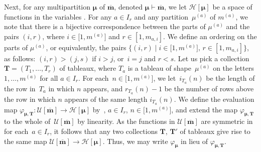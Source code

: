 \documentclass[pdftex]{sigma}
\numberwithin{equation}{section}
\begin{document}
Next, for any multipartition $\bm{\mu}$ of $\overline{\mathbf{m}}$, denoted $\bm{\mu}\vdash \overline{\mathbf{m}}$, we let $\mathcal{H}[\bm{\mu}]$ be a space of functions in the variables
.
For any $a\in I_r$ and any partition~$\mu^{(a)}$ of $m^{(a)}$, we note that there is a bijective correspondence between the parts of $\mu^{(a)}$ and the pairs $(i,r)$, where $i\in \bigl[1,m^{(a)}\bigr]$ and $r\in[1,m_{a,i}]$. We define an ordering on the parts of $\mu^{(a)}$, or equivalently, the pairs $\bigl\{(i,r)\mid i\in \bigl[1,m^{(a)}\bigr],\, r\in[1,m_{a,i}]\bigr\}$, as follows:
$
(i,r)>(j,s)$ if ${i>j}$, or~${ i=j}$ and $r<s$.
Let us pick a collection $\mathbf{T}=(T_1,\dots,T_r)$ of tableaux, where $T_a$ is a tableau of shape~$\mu^{(a)}$ on the letters $1,\dots,m^{(a)}$ for all $a\in I_r$. For each~${n\in\bigl[1,m^{(a)}\bigr]}$, we let~${i_{T_a}(n)}$ be the length of the row in~$T_a$ in which $n$ appears, and $r_{T_a}(n)-1$ be the number of rows above the row in which $n$ appears of the same length $i_{T_a}(n)$. We define the evaluation map ${\varphi_{\bm{\mu},\mathbf{T}}\colon \mathcal{U}[\overline{\mathbf{m}}]\to \mathcal{H}[\bm{\mu}]}$ by~, $ a\in I_r$, $n\in\bigl[1,m^{(a)}\bigr]$,
and extend the map $\varphi_{\bm{\mu},\mathbf{T}}$ to the whole of~$\mathcal{U}[\overline{\mathbf{m}}]$ by linearity. As the functions in $\mathcal{U}[\overline{ \mathbf{m}}]$ are symmetric in~ for each~${a\in I_r}$, it follows that any two collections $\mathbf{T}$, $\mathbf{T}'$ of tableaux give rise to the same map $\mathcal{U}[\overline{\mathbf{m}}] \to \mathcal{H}[\bm{\mu}]$. Thus, we may write $\varphi_{ \bm{\mu}}$ in lieu of $\varphi_{\bm{\mu},\mathbf{T}}$.
\end{document}
